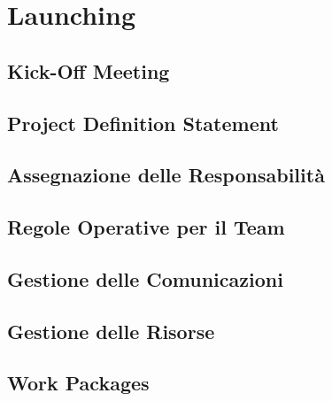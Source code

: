 \chapter{Launching}

\section{Kick-Off Meeting}

\section{Project Definition Statement}

\section{Assegnazione delle Responsabilità}

\section{Regole Operative per il Team}

\section{Gestione delle Comunicazioni}

\section{Gestione delle Risorse}

\section{Work Packages}
